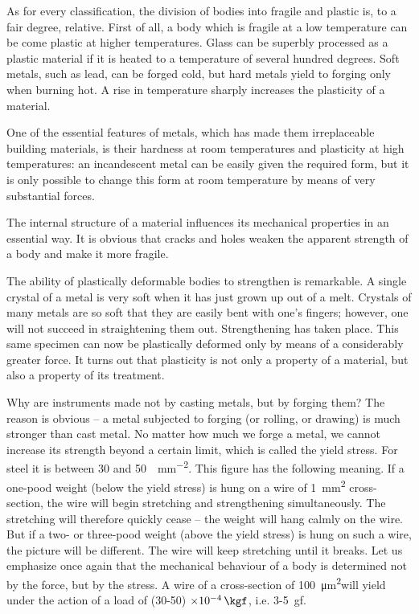 As for every classification, the division of bodies into fragile and plastic is, to a fair degree, relative. First of all, a body which is fragile at a low temperature can be­ come plastic at higher temperatures. Glass can be superb­ly processed as a plastic material if it is heated to a temperature of several hundred degrees. Soft metals, such as lead, can be forged cold, but hard metals yield to forging only when burning hot. A rise in temperature sharply increases the plasticity of a material.

One of the essential features of metals, which has made them irreplaceable building materials, is their hardness at room temperatures and plasticity at high temperatures: an incandescent metal can be easily given the required form, but it is only possible to change this form at room temperature by means of very substantial forces.

The internal structure of a material influences its me­chanical properties in an essential way. It is obvious that cracks and holes weaken the apparent strength of a body and make it more fragile.

The ability of plastically deformable bodies to strengthen is remarkable. A single crystal of a metal is very soft when it has just grown up out of a melt. Crystals of many metals are so soft that they are easily bent with one’s fingers; however, one will not succeed in straightening them out. Strengthening has taken place. This same spec­imen can now be plastically deformed only by means of a considerably greater force. It turns out that plasticity is not only a property of a material, but also a prop­erty of its treatment.

Why are instruments made not by casting metals, but by forging them? The reason is obvious -- a metal subjected to forging (or rolling, or drawing) is much stronger than cast metal. No matter how much we forge a metal, we cannot increase its strength beyond a certain limit, which is called the yield stress. For steel it is between 30 and \SI{50}{\kgf\per\milli\meter\squared}. This figure has the following meaning. If a one-pood weight (below the yield stress) is hung on a wire of \SI{1}{\milli\meter\squared} cross-section, the wire will begin stretching and strengthening simultaneously. The stretching will therefore quickly cease -- the weight will hang calmly on the wire. But if a two- or three-pood weight (above the yield stress) is hung on such a wire, the picture will be different. The wire will keep stretching until it breaks. Let us emphasize once again that the mechanical behav­iour of a body is determined not by the force, but by the stress. A wire of a cross-section of \SI{100}{\micro\meter\squared}will yield under the action of a load of (30-50) $\times \SI{d-4}{\kgf}$, i.e. 3-5~gf.

